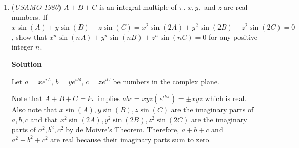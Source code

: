 \begin{enumerate}
\textbf{Solution 2}

Unlike in the previous solution, I am interpreting "arithmetic progressions" to be in the same direction as the monotone sequence of real numbers. So, for example, if the sequence of reals is $1 < 4 < 5 < 6$, then $(4, 5, 6)$ counts but $(6, 5, 4)$ doesn't.

 The first solution proves that there is a sequence with $\lfloor (n - 1)^2 / 4 \rfloor$ such arithmetic progressions. In this solution, I prove that this is in fact the upper bound.

 Count the arithmetic progressions by their center values. Let $x_k$ be the $k$th greatest number. The number $x_k$ is the center of at most $\min(k - 1, n - k)$ arithmetic progressions, because any such progression includes a number less than $x_k$ and a number greater than $x_k$. There are $k - 1$ numbers less than $x_k$ and $n - k$ numbers greater than $x_k$, and none of these can be in two separate arithmetic progressions with the same middle term $x_k$.

 Thus, the total number of arithmetic progressions is at most
 \[\sum_{k = 1}^n \min(k - 1, n - k).\]This equals
 \[1 + 2 + \cdots + \frac{n - 3}{2} + \frac{n - 1}{2} + \frac{n - 3}{2} + \cdots + 2 + 1 = \frac{(n - 1)^2}{4}\]if $n$ is odd, and
 \[1 + 2 + \cdots + \frac{n-2}{2} + \frac n2 + \frac n2 + \frac{n-2}{2} + \cdots + 2 + 1 = \frac{(n - 1)^2 - 1}{4}\]if $n$ is even. This can be summarized as
 \[\left\lfloor \frac{(n - 1)^2}{4} \right\rfloor.\]



	\item (\textit{USAMO 1980}) $A + B + C$ is an integral multiple of $\pi$. $x, y,$ and $z$ are real numbers. If $x\sin(A)+y\sin(B)+z\sin(C)=x^2\sin(2A)+y^2\sin(2B)+z^2\sin(2C)=0$, show that $x^n\sin(nA)+y^n \sin(nB) +z^n \sin(nC)=0$ for any positive integer $n$.


 



\textbf{Solution}

Let $a=xe^{iA}$, $b=ye^{iB}$, $c=ze^{iC}$ be numbers in the complex plane. 

 Note that $A+B+C=k\pi$ implies $abc=xyz(e^{ik\pi})=\pm xyz$ which is real. Also note that $x\sin(A), y\sin(B), z\sin(C)$ are the imaginary parts of $a, b, c$ and that $x^2\sin(2A), y^2\sin(2B), z^2\sin(2C)$ are the imaginary parts of $a^2, b^2, c^2$ by de Moivre's Theorem. Therefore, $a+b+c$ and $a^2+b^2+c^2$ are real because their imaginary parts sum to zero.


\end{enumerate}
